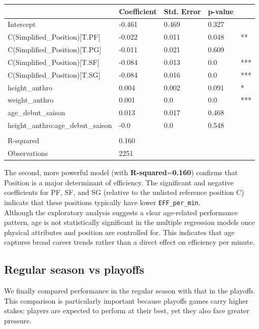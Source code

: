 \documentclass[
  letterpaper,
  DIV=11,
  numbers=noendperiod]{scrartcl}
\begin{document}
\begin{longtable}[]{@{}lllll@{}}
\toprule\noalign{}
& Coefficient & Std. Error & p-value & \\
\midrule\noalign{}
\endhead
\bottomrule\noalign{}
\endlastfoot
Intercept & -0.461 & 0.469 & 0.327 & \\
C(Simplified\_Position){[}T.PF{]} & -0.022 & 0.011 & 0.048 & ** \\
C(Simplified\_Position){[}T.PG{]} & -0.011 & 0.021 & 0.609 & \\
C(Simplified\_Position){[}T.SF{]} & -0.084 & 0.013 & 0.0 & *** \\
C(Simplified\_Position){[}T.SG{]} & -0.084 & 0.016 & 0.0 & *** \\
height\_anthro & 0.004 & 0.002 & 0.091 & * \\
weight\_anthro & 0.001 & 0.0 & 0.0 & *** \\
age\_debut\_saison & 0.013 & 0.017 & 0.468 & \\
height\_anthro:age\_debut\_saison & -0.0 & 0.0 & 0.548 & \\
& & & & \\
R-squared & 0.160 & & & \\
Observations & 2251 & & & \\
\end{longtable}

The second, more powerful model (with \textbf{R-squared}=\textbf{0.160})
confirms that Position is a major determinant of efficiency. The
significant and negative coefficients for PF, SF, and SG (relative to
the unlisted reference position C) indicate that these positions
typically have lower \texttt{EFF\_per\_min}.\\
Although the exploratory analysis suggests a clear age-related
performance pattern, age is not statistically significant in the
multiple regression models once physical attributes and position are
controlled for. This indicates that age captures broad career trends
rather than a direct effect on efficiency per minute.

\subsection{Regular season vs
playoffs}\label{regular-season-vs-playoffs}

We finally compared performance in the regular season with that in the
playoffs. This comparison is particularly important because playoffs
games carry higher stakes: players are expected to perform at their
best, yet they also face greater pressure.
\end{document}
